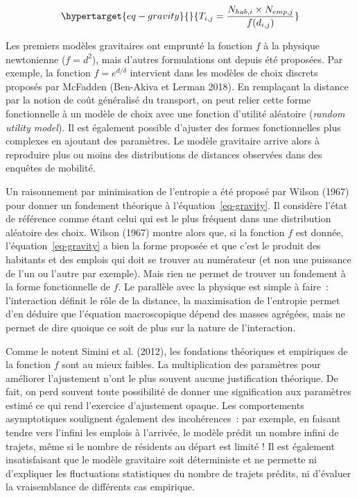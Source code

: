 \documentclass[
  10pt,
  a4paper,
  numbers=noendperiod,
  DIV=9]{scrartcl}
\begin{document}
\begin{equation}\protect\hypertarget{eq-gravity}{}{
T_{i,j} = \frac {N_{hab, i}\times N_{emp, j}} {f(d_{i,j})}
}\label{eq-gravity}\end{equation}

Les premiers modèles gravitaires ont emprunté la fonction \(f\) à la
physique newtonienne (\(f=d^2\)), mais d'autres formulations ont depuis
été proposées. Par exemple, la fonction \(f=e^{d/\delta}\) intervient
dans les modèles de choix discrets proposés par McFadden (Ben-Akiva et
Lerman 2018). En remplaçant la distance par la notion de coût généralisé
du transport, on peut relier cette forme fonctionnelle à un modèle de
choix avec une fonction d'utilité aléatoire (\emph{random utility
model}). Il est également possible d'ajuster des formes fonctionnelles
plus complexes en ajoutant des paramètres. Le modèle gravitaire arrive
alors à reproduire plus ou moins des distributions de distances
observées dans des enquêtes de mobilité.

Un raisonnement par minimisation de l'entropie a été proposé par Wilson
(1967) pour donner un fondement théorique à l'équation~\ref{eq-gravity}.
Il considère l'état de référence comme étant celui qui est le plus
fréquent dans une distribution aléatoire des choix. Wilson (1967) montre
alors que, si la fonction \(f\) est donnée, l'équation~\ref{eq-gravity}
a bien la forme proposée et que c'est le produit des habitants et des
emplois qui doit se trouver au numérateur (et non une puissance de l'un
ou l'autre par exemple). Mais rien ne permet de trouver un fondement à
la forme fonctionnelle de \(f\). Le parallèle avec la physique est
simple à faire~: l'interaction définit le rôle de la distance, la
maximisation de l'entropie permet d'en déduire que l'équation
macroscopique dépend des masses agrégées, mais ne permet de dire quoique
ce soit de plus sur la nature de l'interaction.

Comme le notent Simini et al. (2012), les fondations théoriques et
empiriques de la fonction \(f\) sont au mieux faibles. La multiplication
des paramètres pour améliorer l'ajustement n'ont le plus souvent aucune
justification théorique. De fait, on perd souvent toute possibilité de
donner une signification aux paramètres estimé ce qui rend l'exercice
d'ajustement opaque. Les comportements asymptotiques soulignent
également des incohérences~: par exemple, en faisant tendre vers
l'infini les emplois à l'arrivée, le modèle prédit un nombre infini de
trajets, même si le nombre de résidents au départ est limité ! Il est
également insatisfaisant que le modèle gravitaire soit déterministe et
ne permette ni d'expliquer les fluctuations statistiques du nombre de
trajets prédits, ni d'évaluer la vraisemblance de différents cas
empirique.
\end{document}
